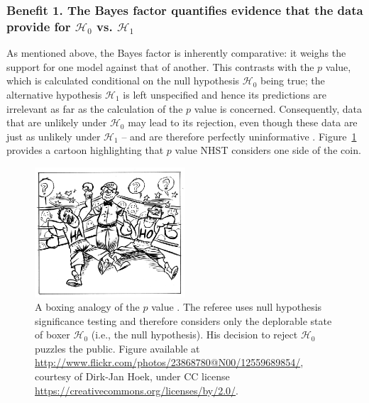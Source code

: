 \subsubsection{Benefit 1. The Bayes factor quantifies evidence that the data provide for $\mathcal{H}_0$ vs. $\mathcal{H}_1$}
As mentioned above, the Bayes factor is inherently comparative: it weighs the support for one model against that of another. This contrasts with the $p$ value, which is calculated conditional on the null hypothesis $\mathcal{H}_0$ being true; the alternative hypothesis $\mathcal{H}_1$ is left unspecified and hence its predictions are irrelevant as far as the calculation of the $p$ value is concerned. Consequently, data that are unlikely under $\mathcal{H}_0$ may lead to its rejection, even though these data are just as unlikely under $\mathcal{H}_1$ -- and are therefore perfectly uninformative \cite{WagenmakersEtAlScrutinyBookinpress}. Figure~\ref{fig:bi1:Boxers} provides a cartoon highlighting that $p$ value NHST considers one side of the coin.

\begin{figure}
    \begin{center}
        \includegraphics[width=0.5\textwidth]{figs/bi1_BoxersLowRes.eps}
        \caption{A boxing analogy of the $p$ value \protect\cite{WagenmakersEtAlScrutinyBookinpress}. The referee uses null hypothesis significance testing and therefore considers only the deplorable state of boxer $\mathcal{H}_0$ (i.e., the null hypothesis). His decision to reject $\mathcal{H}_0$ puzzles the public. Figure available at \protect\url{http://www.flickr.com/photos/23868780@N00/12559689854/}, courtesy of Dirk-Jan Hoek, under CC license \protect\url{https://creativecommons.org/licenses/by/2.0/}.}\label{fig:bi1:Boxers}
    \end{center}
\end{figure}

